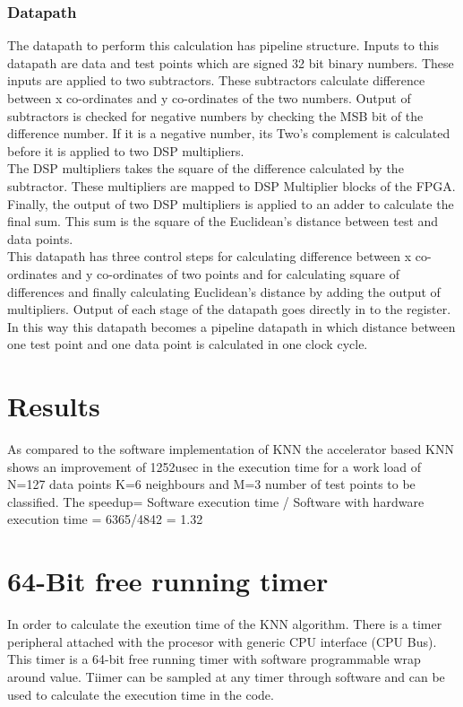 \documentclass[12pt]{article}
\begin{document}
\subsubsection{Datapath}
The datapath to perform this calculation has pipeline structure. Inputs to this datapath are data and test points which are signed 32 bit binary numbers. These inputs are applied to two subtractors. These subtractors calculate difference between x co-ordinates and y co-ordinates of the two numbers. Output of subtractors is checked for negative numbers by checking the MSB bit of the difference number. If it is a negative number, its Two's complement is calculated before it is applied to two DSP multipliers. \\
The DSP multipliers takes the square of the difference calculated by the subtractor. These multipliers are mapped to DSP Multiplier blocks of the FPGA. Finally, the output of two DSP multipliers is applied to an adder to calculate the final sum. This sum is the square of the Euclidean's distance between test and data points.\\
This datapath has three control steps for calculating difference between x co-ordinates and y co-ordinates of two points and for calculating square of differences and finally calculating Euclidean's distance by adding the output of multipliers. Output of each stage of the datapath goes directly in to the register. In this way this datapath becomes a pipeline datapath in which distance between one test point and one data point is calculated in one clock cycle.

\section{Results}
As compared to the software implementation of KNN the accelerator based KNN shows an improvement  of 1252usec in the execution time for a work load of N=127 data points K=6 neighbours and M=3 number of test points to be classified. The speedup= Software execution time / Software with hardware execution time = 6365/4842 = 1.32
\section{64-Bit free running timer}
In order to calculate the exeution time of the KNN algorithm. There is a timer peripheral  attached with the procesor with generic CPU interface (CPU Bus). This timer is a 64-bit free running timer with software programmable wrap around value. Tiimer can be sampled at any timer through software and can be used to calculate the execution time in the code.
\end{document}
